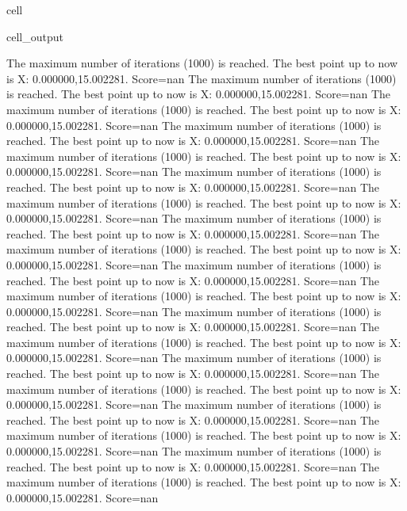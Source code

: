 \documentclass[letterpaper,10pt,english]{jupyterBook}
\begin{document}
\begin{sphinxuseclass}{cell}
\begin{sphinxVerbatimOutput}
\begin{sphinxuseclass}{cell_output}
\begin{sphinxVerbatim}[commandchars=\\\{\}]
The maximum number of iterations (1000) is reached. The best point up to now is X: \PYGZob{}0.000000,15.002281\PYGZcb{}. Score=\PYGZhy{}nan
The maximum number of iterations (1000) is reached. The best point up to now is X: \PYGZob{}0.000000,15.002281\PYGZcb{}. Score=\PYGZhy{}nan
The maximum number of iterations (1000) is reached. The best point up to now is X: \PYGZob{}0.000000,15.002281\PYGZcb{}. Score=\PYGZhy{}nan
The maximum number of iterations (1000) is reached. The best point up to now is X: \PYGZob{}0.000000,15.002281\PYGZcb{}. Score=\PYGZhy{}nan
The maximum number of iterations (1000) is reached. The best point up to now is X: \PYGZob{}0.000000,15.002281\PYGZcb{}. Score=\PYGZhy{}nan
The maximum number of iterations (1000) is reached. The best point up to now is X: \PYGZob{}0.000000,15.002281\PYGZcb{}. Score=\PYGZhy{}nan
The maximum number of iterations (1000) is reached. The best point up to now is X: \PYGZob{}0.000000,15.002281\PYGZcb{}. Score=\PYGZhy{}nan
The maximum number of iterations (1000) is reached. The best point up to now is X: \PYGZob{}0.000000,15.002281\PYGZcb{}. Score=\PYGZhy{}nan
The maximum number of iterations (1000) is reached. The best point up to now is X: \PYGZob{}0.000000,15.002281\PYGZcb{}. Score=\PYGZhy{}nan
The maximum number of iterations (1000) is reached. The best point up to now is X: \PYGZob{}0.000000,15.002281\PYGZcb{}. Score=\PYGZhy{}nan
The maximum number of iterations (1000) is reached. The best point up to now is X: \PYGZob{}0.000000,15.002281\PYGZcb{}. Score=\PYGZhy{}nan
The maximum number of iterations (1000) is reached. The best point up to now is X: \PYGZob{}0.000000,15.002281\PYGZcb{}. Score=\PYGZhy{}nan
The maximum number of iterations (1000) is reached. The best point up to now is X: \PYGZob{}0.000000,15.002281\PYGZcb{}. Score=\PYGZhy{}nan
The maximum number of iterations (1000) is reached. The best point up to now is X: \PYGZob{}0.000000,15.002281\PYGZcb{}. Score=\PYGZhy{}nan
The maximum number of iterations (1000) is reached. The best point up to now is X: \PYGZob{}0.000000,15.002281\PYGZcb{}. Score=\PYGZhy{}nan
The maximum number of iterations (1000) is reached. The best point up to now is X: \PYGZob{}0.000000,15.002281\PYGZcb{}. Score=\PYGZhy{}nan
The maximum number of iterations (1000) is reached. The best point up to now is X: \PYGZob{}0.000000,15.002281\PYGZcb{}. Score=\PYGZhy{}nan
The maximum number of iterations (1000) is reached. The best point up to now is X: \PYGZob{}0.000000,15.002281\PYGZcb{}. Score=\PYGZhy{}nan
The maximum number of iterations (1000) is reached. The best point up to now is X: \PYGZob{}0.000000,15.002281\PYGZcb{}. Score=\PYGZhy{}nan

\end{sphinxVerbatim}
\end{sphinxuseclass}
\end{sphinxVerbatimOutput}
\end{sphinxuseclass}
\end{document}
